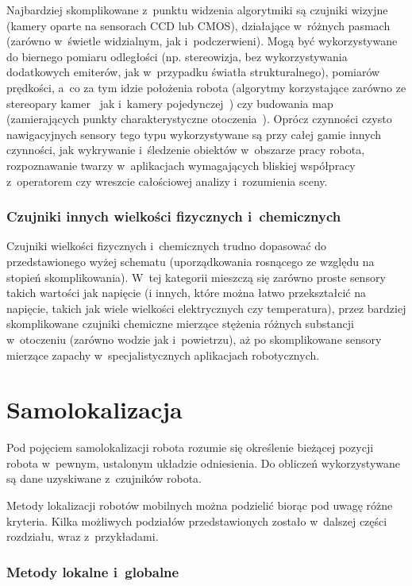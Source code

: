 Najbardziej skomplikowane z~punktu widzenia algorytmiki są czujniki wizyjne
(kamery oparte na sensorach CCD lub CMOS), działające w~różnych pasmach
(zarówno w~świetle widzialnym, jak i~podczerwieni). Mogą być wykorzystywane
do biernego pomiaru odległości (np. stereowizja, bez wykorzystywania dodatkowych
emiterów, jak w~przypadku światła strukturalnego), pomiarów prędkości,
a~co za tym idzie położenia robota (algorytmy korzystające zarówno ze stereopary
kamer~\cite{vodom_stereo} jak i~kamery pojedynczej~\cite{vodom_mono}) czy budowania
map (zamierających punkty charakterystyczne otoczenia~\cite{vslam}). Oprócz
czynności czysto nawigacyjnych sensory tego typu wykorzystywane są przy całej
gamie innych czynności, jak wykrywanie i~śledzenie obiektów w~obszarze pracy robota,
rozpoznawanie twarzy w~aplikacjach wymagających bliskiej współpracy z~operatorem
czy wreszcie całościowej analizy i~rozumienia sceny.

\subsubsection{Czujniki innych wielkości fizycznych i~chemicznych}

Czujniki wielkości fizycznych i~chemicznych trudno dopasować do przedstawionego
wyżej schematu (uporządkowania rosnącego ze względu na stopień skomplikowania).
W~tej kategorii mieszczą się zarówno proste sensory takich wartości jak
napięcie (i innych, które można łatwo przekształcić na napięcie, takich jak
wiele wielkości elektrycznych czy temperatura), przez bardziej skomplikowane
czujniki chemiczne mierzące stężenia różnych substancji w~otoczeniu (zarówno
wodzie jak i~powietrzu), aż po skomplikowane sensory mierzące zapachy
w~specjalistycznych aplikacjach robotycznych.

\section{Samolokalizacja}

Pod pojęciem samolokalizacji robota rozumie się określenie bieżącej pozycji
robota w~pewnym, ustalonym układzie odniesienia. Do obliczeń wykorzystywane
są dane uzyskiwane z~czujników robota.

Metody lokalizacji robotów mobilnych można podzielić biorąc pod uwagę różne
kryteria. Kilka możliwych podziałów przedstawionych zostało w~dalszej części
rozdziału, wraz z~przykładami.

\subsubsection{Metody lokalne i~globalne}

